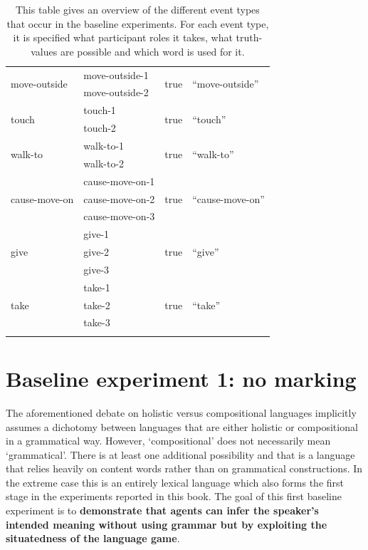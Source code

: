 \begin{table}[htp]
\begin{tabular}{llll}
\\[.3em]\multirow{2}{*}{move-outside } &  move-outside-1 & \multirow{2}{*}{true} & \multirow{2}{*}{``move-outside''}
\\
  &  move-outside-2 & &
\\[.3em]\multirow{2}{*}{touch } &   touch-1 & \multirow{2}{*}{true} & \multirow{2}{*}{``touch''}
\\
 &  touch-2 & &
\\[.3em]\multirow{2}{*}{walk-to } &  walk-to-1 & \multirow{2}{*}{true} & \multirow{2}{*}{``walk-to''}
\\
 &  walk-to-2 & &
\\[.3em]\multirow{3}{*}{cause-move-on } &  cause-move-on-1 & \multirow{3}{*}{true} & \multirow{3}{*}{``cause-move-on''}
\\
  &  cause-move-on-2  & &
\\
  &  cause-move-on-3  & &
\\[.3em]\multirow{3}{*}{   give } &  give-1 & \multirow{3}{*}{true} & \multirow{3}{*}{``give''}
\\
 &   give-2 & &
\\
  &  give-3  & &
\\[.3em]\multirow{3}{*}{take } & take-1 & \multirow{3}{*}{true} & \multirow{3}{*}{``take''}
\\
  &   take-2  & &
\\
 &   take-3  & &
\\
\lspbottomrule
 \end{tabular}
\caption[Event-types and their corresponding words]{This table gives an overview of the different event types that occur in the baseline experiments. For each event type, it is specified what participant roles it takes, what truth-values are possible and which word is used for it.}
\label{t:events}
\end{table}

\section{Baseline experiment 1: no marking}
\label{s:base1}

The aforementioned debate on holistic versus compositional languages implicitly assumes a dichotomy between languages that are either holistic or compositional in a grammatical way. However,  `compositional' does not necessarily mean `grammatical'. There is at least one additional possibility and that is a language that relies heavily on content words rather than on grammatical constructions. In the extreme case this is an entirely lexical language which also forms the first stage in the experiments reported in this book. The goal of this first baseline experiment is to {\bfseries demonstrate that agents can infer the speaker's intended meaning without using grammar but by exploiting the situatedness of the language game}.

